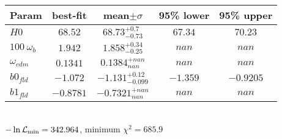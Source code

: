 \begin{tabular}{|l|c|c|c|c|} 
 \hline 
Param & best-fit & mean$\pm\sigma$ & 95\% lower & 95\% upper \\ \hline 
$H0$ &$68.52$ & $68.73_{-0.73}^{+0.7}$ & $67.34$ & $70.23$ \\ 
$100~\omega_{b }$ &$1.942$ & $1.858_{-0.25}^{+0.34}$ & $nan$ & $nan$ \\ 
$\omega_{cdm }$ &$0.1341$ & $0.1384_{nan}^{+nan}$ & $nan$ & $nan$ \\ 
$b0_{fld }$ &$-1.072$ & $-1.131_{-0.099}^{+0.12}$ & $-1.359$ & $-0.9205$ \\ 
$b1_{fld }$ &$-0.8781$ & $-0.7321_{nan}^{+nan}$ & $nan$ & $nan$ \\ 
\hline 
 \end{tabular} \\ 
$-\ln{\cal L}_\mathrm{min} =342.964$, minimum $\chi^2=685.9$ \\ 
